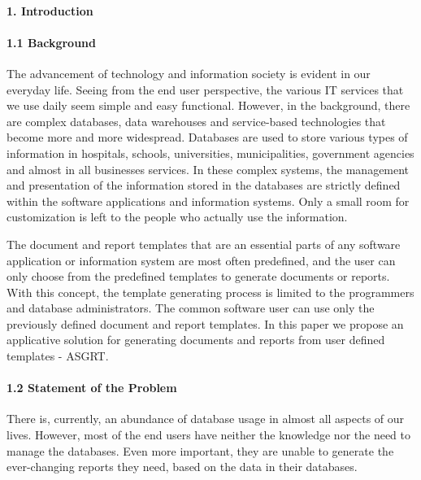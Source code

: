 \documentclass[10pt,a4paper]{report}
\author{De Brayo}
\begin{document}
\paragraph{1.  Introduction}
\paragraph{1.1  Background}
\begin{flushleft}
The advancement of technology and information society is evident in our everyday life. Seeing from the end user perspective, the various IT services that we use daily seem simple and easy functional. However, in the background, there are complex databases, data warehouses and service-based technologies that become more and more widespread. Databases are used to store various types of information in hospitals, schools, universities, municipalities, government agencies and almost in all businesses services. In these complex systems, the management and presentation of the information stored in the databases are strictly defined within the software applications and information systems. Only a small room for customization is left to the people who actually use the information.
\end{flushleft}

\begin{flushleft}
The document and report templates that are an essential parts of any software
application or information system are most often predefined, and the user can only
choose from the predefined templates to generate documents or reports. With this
concept, the template generating process is limited to the programmers and database
administrators. The common software user can use only the previously defined
document and report templates. In this paper we propose an applicative solution for
generating documents and reports from user defined templates - ASGRT. 
\end{flushleft}

\paragraph{1.2  Statement of the Problem}
\begin{flushleft}
There is, currently, an abundance of database usage
in almost all aspects of our lives. However, most of the end users have neither the
knowledge nor the need to manage the databases. Even more important, they are
unable to generate the ever-changing reports they need, based on the data in their
databases. 
\end{flushleft}
\end{document}

